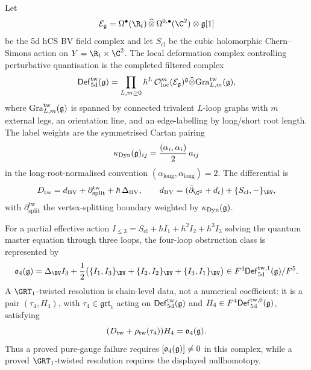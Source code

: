 \begin{definition}
\label{def:thy-qg-nsl-fourloop-def-complex}
Let
\[
 \mathcal E_{\fgg}
 =
 \Omega^\bullet(\R_t)\,\widehat\otimes\,
 \Omega^{0,\bullet}(\C^2)\otimes\fgg[1]
\]
be the 5d hCS BV field complex and let
$S_{\mathrm{cl}}$ be the cubic holomorphic Chern--Simons action on
$Y=\R_t\times\C^2$. The local deformation complex controlling
perturbative quantisation is the completed filtered complex
\[
 \mathsf{Def}^{\mathrm{tw}}_{5\mathrm d}(\mathfrak g)
 =
 \prod_{L,m\ge 0}
 \hbar^L\,
 \mathcal O_{\mathrm{loc}}^{m}(\mathcal E_{\mathfrak g})^{\mathfrak g}
 \widehat\otimes
 \mathrm{Gra}^{\mathrm{tw}}_{L,m}(\mathfrak g),
\]
where $\mathrm{Gra}^{\mathrm{tw}}_{L,m}(\mathfrak g)$ is spanned by connected
trivalent $L$-loop graphs with $m$ external legs, an orientation line,
and an edge-labelling by long/short root length. The label weights are
the symmetrised Cartan pairing
\[
 \kappa_{\mathrm{Dyn}}(\mathfrak g)_{ij}
 =
 \frac{(\alpha_i,\alpha_i)}{2}\,a_{ij}
\]
in the long-root-normalised convention
$(\alpha_{\mathrm{long}},\alpha_{\mathrm{long}})=2$. The differential is
\[
 D_{\mathrm{tw}}
 =
 d_{\mathrm{BV}}
 +\partial_{\mathrm{split}}^{\mathrm{tw}}
 +\hbar\,\Delta_{\mathrm{BV}},
 \qquad
 d_{\mathrm{BV}}=(\bar\partial_{\C^2}+d_t)+\{S_{\mathrm{cl}},-\}_{\BV},
\]
with $\partial_{\mathrm{split}}^{\mathrm{tw}}$ the vertex-splitting
boundary weighted by $\kappa_{\mathrm{Dyn}}(\mathfrak g)$.

For a partial effective action
$I_{\le 3}=S_{\mathrm{cl}}+\hbar I_1+\hbar^2 I_2+\hbar^3 I_3$ solving
the quantum master equation through three loops, the four-loop
obstruction class is represented by
\[
 \mathfrak o_4(\fgg)
 =
 \Delta_{\BV} I_3
 +\frac12\bigl(
 \{I_1,I_3\}_{\BV}+\{I_2,I_2\}_{\BV}+\{I_3,I_1\}_{\BV}
 \bigr)
 \in
 F^4\mathsf{Def}^{\mathrm{tw},1}_{5\mathrm d}(\fgg)/
 F^5 .
\]
A $\GRT_1$-twisted resolution is chain-level data, not a numerical
coefficient: it is a pair $(\tau_4,H_4)$, with
$\tau_4\in\mathfrak{grt}_1$ acting on
$\mathsf{Def}^{\mathrm{tw}}_{5\mathrm d}(\mathfrak g)$ and
$H_4\in F^4\mathsf{Def}^{\mathrm{tw},0}_{5\mathrm d}(\mathfrak g)$, satisfying
\[
 (D_{\mathrm{tw}}+\rho_{\mathrm{tw}}(\tau_4))H_4
 =
 \mathfrak o_4(\mathfrak g).
\]
Thus a proved pure-gauge failure requires
$[\mathfrak o_4(\mathfrak g)]\ne 0$ in this complex, while a proved
$\GRT_1$-twisted resolution requires the displayed nullhomotopy.
\end{definition}

